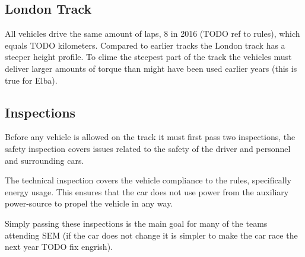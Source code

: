 \subsection{London Track}
All vehicles drive the same amount of laps, 8 in 2016 (TODO ref to rules), which equals TODO kilometers. Compared to earlier tracks the London track has a steeper height profile. To clime the steepest part of the track the vehicles must deliver larger amounts of torque than might have been used earlier years (this is true for Elba). 

\subsection{Inspections}
Before any vehicle is allowed on the track it must first pass two inspections, the safety inspection covers issues related to the safety of the driver and personnel and surrounding cars. 

The technical inspection covers the vehicle compliance to the rules, specifically energy usage. This ensures that the car does not use power from the auxiliary power-source to propel the vehicle in any way.

Simply passing these inspections is the main goal for many of the teams attending SEM (if the car does not change it is simpler to make the car race the next year TODO fix engrish).